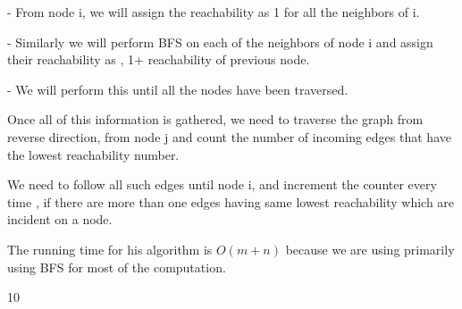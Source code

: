 \documentclass[letterpaper,portrait,12pt]{article}
\begin{document}
\begin{flushleft}
- From node i, we will assign the reachability as 1 for all the neighbors of i.
\end{flushleft}


\begin{flushleft}
- Similarly we will perform BFS on each of the neighbors of node i and assign their reachability as , 1+ reachability of previous node.
\end{flushleft}


\begin{flushleft}
- We will perform this until all the nodes have been traversed.
\end{flushleft}


\begin{flushleft}

\end{flushleft}


\begin{flushleft}
Once all of this information is gathered, we need to traverse the graph from reverse direction, from node j and count the number of incoming edges that have the lowest reachability number.
\end{flushleft}


\begin{flushleft}

\end{flushleft}


\begin{flushleft}
We need to follow all such edges until node i, and increment the counter every time , if there are more than one edges having same lowest reachability which are incident on a node.
\end{flushleft}


\begin{flushleft}

\end{flushleft}


\begin{flushleft}
The running time for his algorithm is $O(m+n)$ because we are using primarily using BFS for most of the computation. 
\end{flushleft}


\begin{flushleft}

\end{flushleft}


\begin{flushleft}

\end{flushleft}


\begin{flushleft}

\end{flushleft}


\begin{flushleft}

\end{flushleft}


\begin{flushleft}

\end{flushleft}




10
\end{document}
